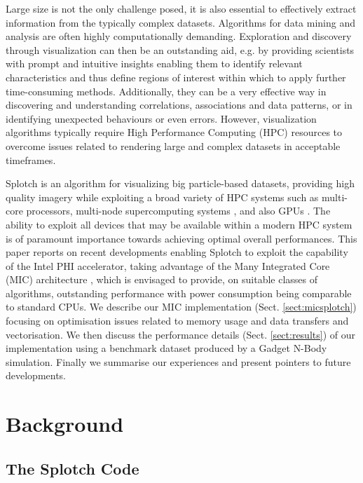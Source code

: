 \documentclass[runningheads,a4paper]{llncs}
\begin{document}
Large size is not the only challenge posed, it is also essential to effectively extract information from the typically complex datasets. 
Algorithms for data mining and analysis are often highly computationally demanding.
Exploration and discovery through visualization can then be an outstanding aid,
e.g. by providing scientists with prompt and intuitive insights enabling them to identify relevant characteristics and thus
define regions of interest within which to apply further time-consuming methods. Additionally, they can be a very effective
way in discovering and understanding correlations, associations and data patterns, or in identifying unexpected behaviours or
even errors. However, visualization algorithms typically require High Performance Computing (HPC) resources to overcome issues
related to rendering large and complex datasets in acceptable timeframes.

Splotch\cite{splotch} is an algorithm for visualizing big particle-based datasets, providing high quality imagery while exploiting
a broad variety of HPC systems such as multi-core processors, multi-node supercomputing systems \cite{splotchmulti}, and
also GPUs \cite{splotchgpu}. The ability to exploit all devices that may be available within a modern HPC system is of paramount
importance towards achieving optimal overall performances. This paper reports on recent developments enabling Splotch to
exploit the capability of the Intel PHI \cite{xeonphi} accelerator, taking advantage of the Many Integrated Core (MIC)
architecture \cite{mic}, which is envisaged to provide, on suitable classes of algorithms, outstanding performance with power
consumption being comparable to standard CPUs. We describe our MIC implementation (Sect. \ref{sect:micsplotch}) focusing on
optimisation issues related to memory usage and data transfers and vectorisation. We then discuss the performance details
(Sect. \ref{sect:results}) of our implementation using a benchmark dataset produced by a Gadget \cite{gadget} N-Body simulation. 
Finally we summarise our experiences and present pointers to future developments.

\section{Background}
\label{sect:background}

\subsection{The Splotch Code}
\label{sect:splotchcode}
\end{document}

